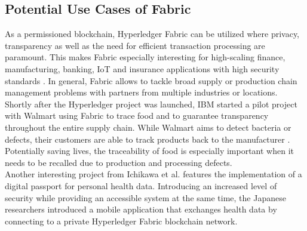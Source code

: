 \subsection{Potential Use Cases of Fabric}
As a permissioned blockchain, Hyperledger Fabric can be utilized where privacy, transparency as well as the need for efficient transaction processing are paramount. This makes Fabric especially interesting for high-scaling finance, manufacturing, banking, IoT and insurance applications with high security standards \cite{Fabric2019}. In general, Fabric allows to tackle broad supply or production chain management problems with partners from multiple industries or locations. \\
Shortly after the Hyperledger project was launched, IBM started a pilot project with Walmart using Fabric to trace food and to guarantee transparency throughout the entire supply chain. While Walmart aims to detect bacteria or defects, their customers are able to track products back to the manufacturer \cite{Aitken2017}. Potentially saving lives, the traceability of food is especially important when it needs to be recalled due to production and processing defects. \\
Another interesting project from Ichikawa et al. \cite{Ichikawa2017} features the implementation of a digital passport for personal health data. Introducing an increased level of security while providing an accessible system at the same time, the Japanese researchers introduced a mobile application that exchanges health data by connecting to a private Hyperledger Fabric blockchain network.